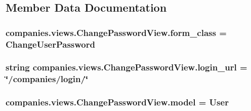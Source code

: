 \subsection{Member Data Documentation}
\hypertarget{classcompanies_1_1views_1_1_change_password_view_af07bafeceb83b99a2271274744533a43}{
\subsubsection[{form\-\_\-class}]{\setlength{\rightskip}{0pt plus 5cm}companies.\-views.\-Change\-Password\-View.\-form\-\_\-class = Change\-User\-Password\hspace{0.3cm}{\ttfamily [static]}}}\label{classcompanies_1_1views_1_1_change_password_view_af07bafeceb83b99a2271274744533a43}
\hypertarget{classcompanies_1_1views_1_1_change_password_view_a6aae41c3fc842f9d205809535c081692}{
\subsubsection[{login\-\_\-url}]{\setlength{\rightskip}{0pt plus 5cm}string companies.\-views.\-Change\-Password\-View.\-login\-\_\-url = \char`\"{}/companies/login/\char`\"{}\hspace{0.3cm}{\ttfamily [static]}}}\label{classcompanies_1_1views_1_1_change_password_view_a6aae41c3fc842f9d205809535c081692}
\hypertarget{classcompanies_1_1views_1_1_change_password_view_a564bbd3a310f80714fbf52c84b084f03}{
\subsubsection[{model}]{\setlength{\rightskip}{0pt plus 5cm}companies.\-views.\-Change\-Password\-View.\-model = User\hspace{0.3cm}{\ttfamily [static]}}}\label{classcompanies_1_1views_1_1_change_password_view_a564bbd3a310f80714fbf52c84b084f03}
